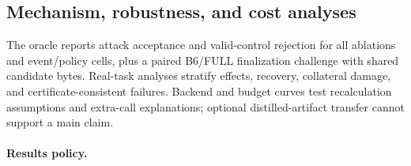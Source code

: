 \subsection{Mechanism, robustness, and cost analyses}

The oracle reports attack acceptance and valid-control rejection for all
ablations and event/policy cells, plus a paired B6/FULL finalization challenge
with shared candidate bytes. Real-task analyses stratify effects, recovery,
collateral damage, and certificate-consistent failures. Backend and budget
curves test recalculation assumptions and extra-call explanations; optional
distilled-artifact transfer cannot support a main claim.

\paragraph{Results policy.}
